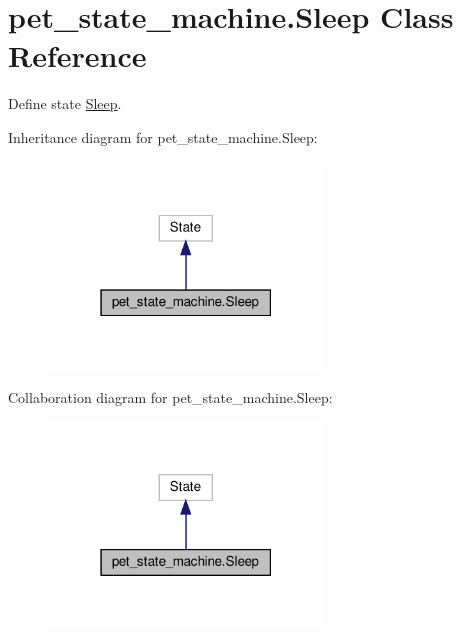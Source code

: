 \hypertarget{classpet__state__machine_1_1Sleep}{}\section{pet\+\_\+state\+\_\+machine.\+Sleep Class Reference}
\label{classpet__state__machine_1_1Sleep}


Define state \hyperlink{classpet__state__machine_1_1Sleep}{Sleep}.  




Inheritance diagram for pet\+\_\+state\+\_\+machine.\+Sleep\+:
\nopagebreak
\begin{figure}[H]
\begin{center}
\leavevmode
\includegraphics[width=207pt]{classpet__state__machine_1_1Sleep__inherit__graph}
\end{center}
\end{figure}


Collaboration diagram for pet\+\_\+state\+\_\+machine.\+Sleep\+:
\nopagebreak
\begin{figure}[H]
\begin{center}
\leavevmode
\includegraphics[width=207pt]{classpet__state__machine_1_1Sleep__coll__graph}
\end{center}
\end{figure}
